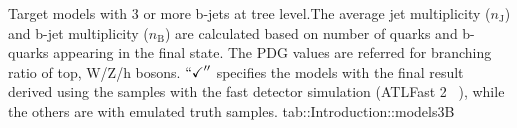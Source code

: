 {Target models with 3 or more b-jets at tree level.The average jet multiplicity ($n_{\mathrm{J}}$) and b-jet multiplicity ($n_{\mathrm{B}}$) are calculated based on number of quarks and b-quarks appearing in the final state. The PDG values \cite{PDG2016} are referred for branching ratio of top, W/Z/h bosons. $``\checkmark''$ specifies the models with the final result derived using the samples with the fast detector simulation (ATLFast 2 ~\cite{atlfast}), while the others are with emulated truth samples.}
{tab::Introduction::models3B}
